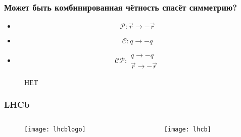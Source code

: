 \begin{frame}
    \frametitle{Может быть комбинированная чётность спасёт симметрию?}
    \begin{itemize}[<+->]
        \item
            \begin{equation*}
                \mathcal{P}: \vec{r} \to - \vec{r}
            \end{equation*}
        \item
            \begin{equation*}
                \mathcal{C}: q \to - q
            \end{equation*}
        \item
            \begin{equation*}
                \mathcal{CP}:
                \begin{array}{c}
                    q \to - q \\
                    \vec{r} \to - \vec{r}
                \end{array}
            \end{equation*}
    \end{itemize}
\end{frame}
\begin{frame}
    \begin{figure}
        {\LARGE НЕТ}
    \end{figure}
\end{frame}

\begin{frame}
    \frametitle{LHCb}
    \begin{columns}
        \begin{column}{0.5\textwidth}
            \begin{figure}
                \begin{centering}
                    \texttt{[image: lhcblogo]}
                \end{centering}
            \end{figure}
        \end{column}
        \begin{column}{0.5\textwidth}
            \begin{figure}
                \begin{centering}
                    \texttt{[image: lhcb]}
                \end{centering}
            \end{figure}
        \end{column}
    \end{columns}
\end{frame}

